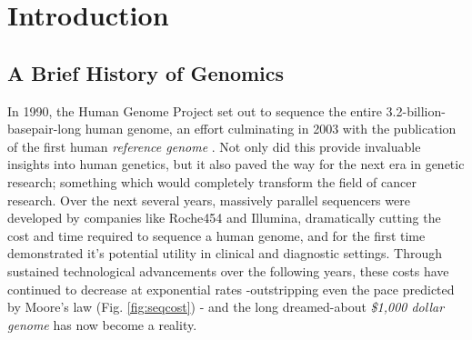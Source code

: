 \chapter{Introduction}
\label{introduction}
\setlength\parindent{0pt}

\section{A Brief History of Genomics}

In 1990, the Human Genome Project \cite{olson1993human} set out to sequence the entire 3.2-billion-basepair-long human genome, an effort culminating in 2003 with the publication of the first human \textit{reference genome} \cite{international2004finishing}. Not only did this provide invaluable insights into human genetics, but it also paved the way for the next era in genetic research; something which would completely transform the field of cancer research. Over the next several years, massively parallel sequencers were developed by companies like Roche454 and Illumina, dramatically cutting the cost and time required to sequence a human genome, and for the first time demonstrated it's potential utility in clinical and diagnostic settings. Through sustained technological advancements over the following years, these costs have continued to decrease at exponential rates -outstripping even the pace predicted by Moore's law (Fig. \ref{fig:seqcost}) - and the long dreamed-about \textit{\$1,000 dollar genome} \cite{thousanddollargenome} \cite{sequencingcostsNHGRI} has now become a reality.

